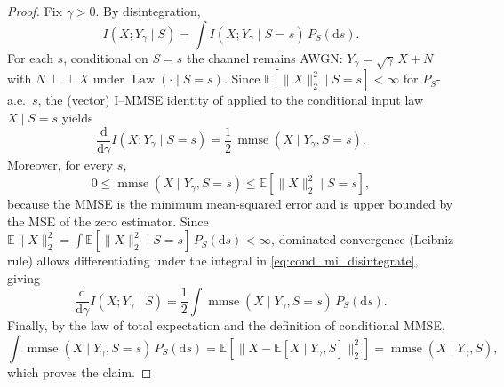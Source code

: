 \documentclass[twoside,11pt]{article}
\DeclareMathOperator{\mmse}{mmse}
\newcommand{\E}{\mathbb{E}}
\newcommand{\dd}{\mathrm{d}}
\newcommand{\Law}{\operatorname{Law}}
\numberwithin{equation}{section}
\begin{document}
\begin{proof}
Fix $\gamma>0$. By disintegration,
\begin{equation}\label{eq:cond_mi_disintegrate}
I(X;Y_\gamma\mid S)=\int I(X;Y_\gamma\mid S=s)\,P_S(\dd s).
\end{equation}
For each $s$, conditional on $S=s$ the channel remains AWGN:
$Y_\gamma=\sqrt{\gamma}\,X+N$ with $N\perp\!\!\!\perp X$ under $\Law(\cdot\mid S=s)$.
Since $\E[\|X\|_2^2\mid S=s]<\infty$ for $P_S$-a.e.\ $s$, the (vector) I--MMSE
identity of \citep{guo2005mutual} applied to the conditional input law $X\mid S=s$
yields
\begin{equation}\label{eq:immse_cond_s}
\frac{\dd}{\dd\gamma}I(X;Y_\gamma\mid S=s)
=
\frac12\,\mmse(X\mid Y_\gamma,S=s).
\end{equation}
Moreover, for every $s$,
\[
0\le \mmse(X\mid Y_\gamma,S=s)\le \E[\|X\|_2^2\mid S=s],
\]
because the MMSE is the minimum mean-squared error and is upper bounded by the MSE
of the zero estimator. Since $\E\|X\|_2^2=\int \E[\|X\|_2^2\mid S=s]\,P_S(\dd s)<\infty$,
dominated convergence (Leibniz rule) allows differentiating under the integral in
\eqref{eq:cond_mi_disintegrate}, giving
\[
\frac{\dd}{\dd\gamma}I(X;Y_\gamma\mid S)
=
\frac12\int \mmse(X\mid Y_\gamma,S=s)\,P_S(\dd s).
\]
Finally, by the law of total expectation and the definition of conditional MMSE,
\[
\int \mmse(X\mid Y_\gamma,S=s)\,P_S(\dd s)
=
\E\!\left[\big\|X-\E[X\mid Y_\gamma,S]\big\|_2^2\right]
=
\mmse(X\mid Y_\gamma,S),
\]
which proves the claim.
\end{proof}
\end{document}

